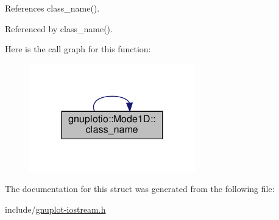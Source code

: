 References class\+\_\+name().



Referenced by class\+\_\+name().

Here is the call graph for this function\+:\nopagebreak
\begin{figure}[H]
\begin{center}
\leavevmode
\includegraphics[width=204pt]{structgnuplotio_1_1_mode1_d_a508d170d84da4dfb7cd07eebad894b8f_cgraph}
\end{center}
\end{figure}


The documentation for this struct was generated from the following file\+:\begin{DoxyCompactItemize}
\item 
include/\hyperlink{gnuplot-iostream_8h}{gnuplot-\/iostream.\+h}\end{DoxyCompactItemize}
